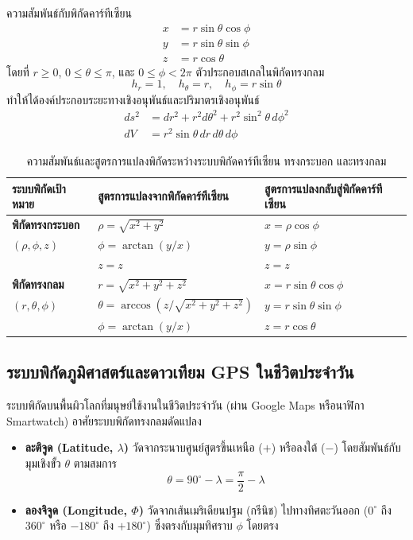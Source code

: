 ความสัมพันธ์กับพิกัดคาร์ทีเซียน
\begin{align}
x &= r \sin\theta \cos\phi \\
y &= r \sin\theta \sin\phi \\
z &= r \cos\theta
\end{align}
โดยที่ $r \ge 0$, $0 \le \theta \le \pi$, และ $0 \le \phi < 2\pi$
ตัวประกอบสเกลในพิกัดทรงกลม
\begin{equation}
h_r = 1, \quad h_\theta = r, \quad h_\phi = r\sin\theta
\end{equation}
ทำให้ได้องค์ประกอบระยะทางเชิงอนุพันธ์และปริมาตรเชิงอนุพันธ์
\begin{align}
ds^2 &= dr^2 + r^2 d\theta^2 + r^2 \sin^2\theta \, d\phi^2 \\
dV &= r^2 \sin\theta \, dr \, d\theta \, d\phi
\end{align}

\begin{table}[htbp]
    \centering
    \caption{ความสัมพันธ์และสูตรการแปลงพิกัดระหว่างระบบพิกัดคาร์ทีเซียน ทรงกระบอก และทรงกลม}
    \label{tab:coord_transforms}
    \begin{tabularx}{\textwidth}{p{3.2cm}YY}
        \toprule
        \textbf{ระบบพิกัดเป้าหมาย} & \textbf{สูตรการแปลงจากพิกัดคาร์ทีเซียน} & \textbf{สูตรการแปลงกลับสู่พิกัดคาร์ทีเซียน} \\
        \midrule
        \textbf{พิกัดทรงกระบอก} & $\rho = \sqrt{x^2 + y^2}$ & $x = \rho \cos\phi$ \\
        $(\rho, \phi, z)$ & $\phi = \arctan(y/x)$ & $y = \rho \sin\phi$ \\
        & $z = z$ & $z = z$ \\
        \midrule
        \textbf{พิกัดทรงกลม} & $r = \sqrt{x^2 + y^2 + z^2}$ & $x = r \sin\theta \cos\phi$ \\
        $(r, \theta, \phi)$ & $\theta = \arccos(z / \sqrt{x^2 + y^2 + z^2})$ & $y = r \sin\theta \sin\phi$ \\
        & $\phi = \arctan(y/x)$ & $z = r \cos\theta$ \\
        \bottomrule
    \end{tabularx}
\end{table}

\subsection{ระบบพิกัดภูมิศาสตร์และดาวเทียม GPS ในชีวิตประจำวัน}
ระบบพิกัดบนพื้นผิวโลกที่มนุษย์ใช้งานในชีวิตประจำวัน (ผ่าน Google Maps หรือนาฬิกา Smartwatch) อาศัยระบบพิกัดทรงกลมดัดแปลง
\begin{itemize}
    \item \textbf{ละติจูด (Latitude, $\lambda$)} วัดจากระนาบศูนย์สูตรขึ้นเหนือ ($+$) หรือลงใต้ ($-$) โดยสัมพันธ์กับมุมเชิงขั้ว $\theta$ ตามสมการ
    \begin{equation}
    \theta = 90^\circ - \lambda = \frac{\pi}{2} - \lambda
    \end{equation}
    \item \textbf{ลองจิจูด (Longitude, $\Phi$)} วัดจากเส้นเมริเดียนปฐม (กรีนิช) ไปทางทิศตะวันออก ($0^\circ$ ถึง $360^\circ$ หรือ $-180^\circ$ ถึง $+180^\circ$) ซึ่งตรงกับมุมทิศราบ $\phi$ โดยตรง
\end{itemize}


